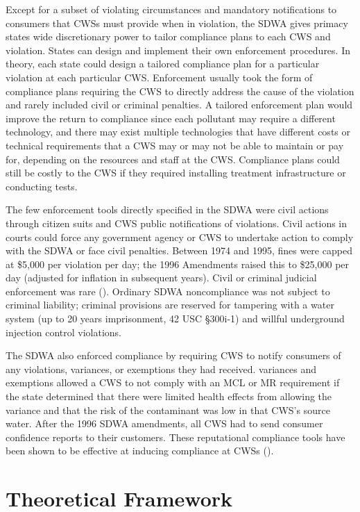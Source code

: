 \documentclass{article}
\begin{document}
Except for a subset of violating circumstances and mandatory notifications to consumers that CWSs must provide when in violation, the SDWA gives primacy states wide discretionary power to tailor compliance plans to each CWS and violation. States can design and implement their own enforcement procedures. In theory, each state could design a tailored compliance plan for a particular violation at each particular CWS. Enforcement usually took the form of compliance plans requiring the CWS to directly address the cause of the violation and rarely included civil or criminal penalties. A tailored enforcement plan would improve the return to compliance since each pollutant may require a different technology, and there may exist multiple technologies that have different costs or technical requirements that a CWS may or may not be able to maintain or pay for, depending on the resources and staff at the CWS. Compliance plans could still be costly to the CWS if they required installing treatment infrastructure or conducting tests. 

The few enforcement tools directly specified in the SDWA were civil actions through citizen suits and CWS public notifications of violations. Civil actions in courts could force any government agency or CWS to undertake action to comply with the SDWA or face civil penalties. Between 1974 and 1995, fines were capped at \$5,000 per violation per day; the 1996 Amendments raised this to \$25,000 per day (adjusted for inflation in subsequent years). Civil or criminal judicial enforcement was rare (\cite{shimshack2014economics}). Ordinary SDWA noncompliance was not subject to criminal liability; criminal provisions are reserved for tampering with a water system (up to 20 years imprisonment, 42 USC §300i-1) and willful underground injection control violations.

The SDWA also enforced compliance by requiring CWS to notify consumers of any violations, variances, or exemptions they had received. variances and exemptions allowed a CWS to not comply with an MCL or MR requirement if the state determined that there were limited health effects from allowing the variance and that the risk of the contaminant was low in that CWS's source water. After the 1996 SDWA amendments, all CWS had to send consumer confidence reports to their customers. These reputational compliance tools have been shown to be effective at inducing compliance at CWSs (\cite{bennear2008impacts}).

\section{Theoretical Framework}
\end{document}
